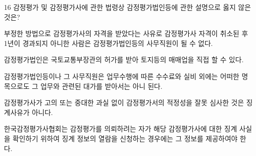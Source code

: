 \begin{question}{16}
감정평가 및 감정평가사에 관한 법령상 감정평가법인등에 관한 설명으로 옳지 않은 것은?
\begin{choices}
  \item 부정한 방법으로 감정평가사의 자격을 받았다는 사유로 감정평가사 자격이 취소된 후 1년이 경과되지 아니한 사람은 감정평가법인등의 사무직원이 될 수 없다.
  \item 감정평가법인은 국토교통부장관의 허가를 받아 토지등의 매매업을 직접 할 수 있다.
  \item 감정평가법인등이나 그 사무직원은 업무수행에 따른 수수료와 실비 외에는 어떠한 명목으로도 그 업무와 관련된 대가를 받아서는 아니 된다.
  \item 감정평가사가 고의 또는 중대한 과실 없이 감정평가서의 적정성을 잘못 심사한 것은 징계사유가 아니다.
  \item 한국감정평가사협회는 감정평가를 의뢰하려는 자가 해당 감정평가사에 대한 징계 사실을 확인하기 위하여 징계 정보의 열람을 신청하는 경우에는 그 정보를 제공하여야 한다.
\end{choices}
\end{question}
